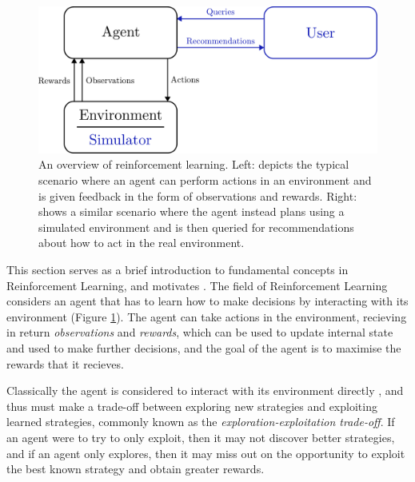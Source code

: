     \begin{figure}
        \centering\includegraphics[width=1.0\textwidth]{figures/ch2/rl_overview.pdf} 
        \caption[An overview of reinforcement learning.]{An overview of reinforcement learning. Left: depicts the typical scenario where an agent can perform actions in an environment and is given feedback in the form of observations and rewards. Right: shows a similar scenario where the agent instead plans using a simulated environment and is then queried for recommendations about how to act in the real environment. }
        \label{fig:rl_overview}
    \end{figure}


    This section serves as a brief introduction to fundamental concepts in Reinforcement Learning, and motivates . The field of Reinforcement Learning considers an agent that has to learn how to make decisions by interacting with its environment (Figure \ref{fig:rl_overview}). The agent can take actions in the environment, recieving in return \textit{observations} and \textit{rewards}, which can be used to update internal state and used to make further decisions, and the goal of the agent is to maximise the rewards that it recieves.

    Classically the agent is considered to interact with its environment directly , and thus must make a trade-off between exploring new strategies and exploiting learned strategies, commonly known as the \textit{exploration-exploitation trade-off}. If an agent were to try to only exploit, then it may not discover better strategies, and if an agent only explores, then it may miss out on the opportunity to exploit the best known strategy and obtain greater rewards.

